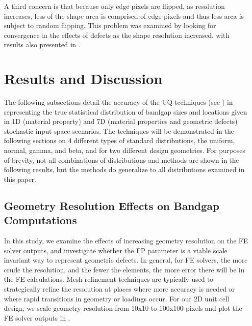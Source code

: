 \documentclass[preprint,review,12pt]{elsarticle}
\begin{document}
A third concern is that because only edge pixels are flipped, as resolution increases, less of the shape area is comprised of edge pixels and thus less area is subject to random flipping. This problem was examined by looking for convergence in the effects of defects as the shape resolution increased, with results also presented in . 
\section{Results and Discussion}
\label{sec:Results}
The following subsections detail the accuracy of the UQ techniques (see ) in representing the true statistical distribution of bandgap sizes and locations given  in 1D (material property) and 7D (material properties and geometric defects) stochastic input space scenarios. The techniques will be demonstrated in the following sections on 4 different types of standard distributions, the uniform, normal, gamma, and beta, and for two different design geometries. For purposes of brevity, not all combinations of distributions and methods are shown in the following results, but the methods do generalize to all distributions examined in this paper. 
\subsection{Geometry Resolution Effects on Bandgap Computations}
\label{subsec:r_geo}
In this study, we examine the effects of increasing geometry resolution on the FE solver outputs, and investigate whether the FP parameter is a viable scale invariant way to represent geometric defects. In general, for FE solvers, the more crude the resolution, and the fewer the elements, the more error there will be in the FE calculations. Mesh refinement techniques are typically used to strategically refine the resolution at places where more accuracy is needed or where rapid transitions in geometry or loadings occur. For our 2D unit cell design, we scale geometry resolution from 10x10 to 100x100 pixels and plot the FE solver outputs in .
\end{document}
